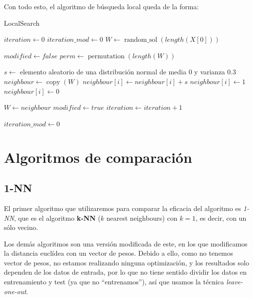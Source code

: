 \documentclass[11pt,a4paper]{article}
\begin{document}
Con todo esto, el algoritmo de búsqueda local queda de la forma: \\
\begin{algorithm}[H]
	\caption{{\sc LocalSearch}}
	
	$iteration \gets 0$ \;
	$iteration\_mod \gets 0$ \;
	$W \gets \operatorname{random\_sol}(length(X[0]))$ \;
	 {
		$modified \gets false$ \;
		$perm \gets \operatorname{permutation}(length(W))$ \;
		
		 {
			$s \gets$ elemento aleatorio de una distribución normal de media 0 y varianza 0.3 \;
			$neighbour \gets \operatorname{copy}(W)$ \;
			$neighbour[i] \gets neighbour[i] + s$ \;
			 {
				$neighbour[i] \gets 1$ \;
			}  {
				$neighbour[i] \gets 0$ \;
			}
			
			 {
				$W \gets neighbour$ \;
				$modified \gets true$ \;
			}
			$iteration \gets iteration + 1$ \;
		} 
		 {
			$iteration\_mod \gets 0$ \;
		} 
	}
	 \;
\end{algorithm}

\newpage
\section{Algoritmos de comparación}

\subsection{1-NN}

El primer algoritmo que utilizaremos para comparar la eficacia del algoritmo es \emph{1-NN}, que es el algoritmo \textbf{k-NN} ($k$ nearest neighbours) con $k = 1$, es decir, con un sólo vecino.

Los demás algoritmos son una versión modificada de este, en los que modificamos la distancia euclídea con un vector de pesos. Debido a ello, como no tenemos vector de pesos, no estamos realizando ninguna optimización, y los resultados solo dependen de los datos de entrada, por lo que no tiene sentido dividir los datos en entrenamiento y test (ya que no ``entrenamos''), así que usamos la técnica \emph{leave-one-out}.
\end{document}
